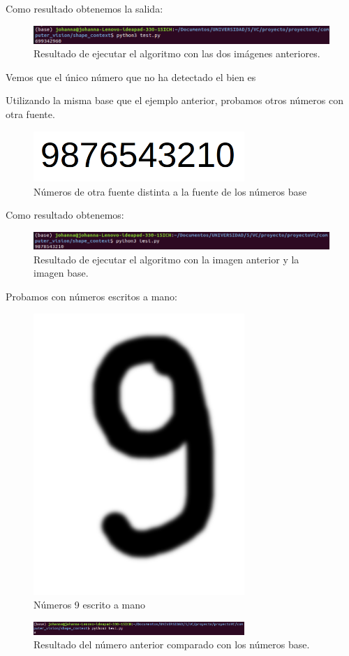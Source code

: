\documentclass[size=a4, parskip=half, titlepage=false, toc=flat, toc=bib, 12pt]{scrartcl}
\begin{document}
Como resultado obtenemos la salida:

\begin{figure}[H]
\centering
\includegraphics[width=15cm]{./img/restelefono}
\caption{Resultado de ejecutar el algoritmo con las dos imágenes anteriores.}
\end{figure}

Vemos que el único número que no ha detectado el bien es

Utilizando la misma base que el ejemplo anterior, probamos otros números con otra fuente.
\begin{figure}[H]
\centering
\includegraphics[width=8cm]{./img/otrafuente}
\caption{Números de otra fuente distinta a la fuente de los números base}
\end{figure}
Como resultado obtenemos:

\begin{figure}[H]
\centering
\includegraphics[width=15cm]{./img/resotra}
\caption{Resultado de ejecutar el algoritmo con la imagen anterior y la imagen base.}
\end{figure}

Probamos con números escritos a mano:
\begin{figure}[H]
\centering
\includegraphics[width=8cm]{./img/9}
\caption{Números 9 escrito a mano}
\end{figure}
\begin{figure}[H]
\centering
\includegraphics[width=8cm]{./img/res9}
\caption{Resultado del número anterior comparado con los números base.}
\end{figure}
\end{document}
